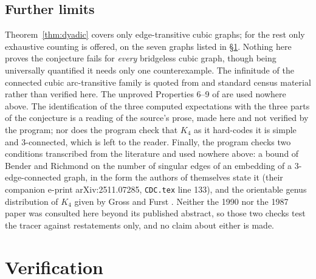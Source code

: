 \documentclass[11pt]{amsart}
\begin{document}
\subsection*{Further limits}
Theorem~\ref{thm:dyadic} covers only edge-transitive cubic graphs; for the
rest only exhaustive counting is offered, on the seven graphs listed in
\S\ref{sec:verification}. Nothing here proves the conjecture fails for
\emph{every} bridgeless cubic graph, though being universally quantified it
needs only one counterexample. The infinitude of the connected cubic
arc-transitive family is quoted from \cite{BH} and standard census material
rather than verified here. The unproved Properties 6--9 of \cite{GS} are used
nowhere above. The identification of the three computed expectations with the
three parts of the conjecture is a reading of the source's prose, made here and
not verified by the program; nor does the program check that $K_4$ as it
hard-codes it is simple and $3$-connected, which is left to the reader.
Finally, the program checks two conditions transcribed from the literature and
used nowhere above: a bound of Bender and Richmond \cite{BR} on the number of
singular edges of an embedding of a $3$-edge-connected graph, in the form the
authors of \cite{GS} themselves state it (their companion e-print
arXiv:2511.07285, \texttt{CDC.tex} line 133), and the orientable genus
distribution of $K_4$ given by Gross and Furst \cite{GF}. Neither the 1990 nor
the 1987 paper was consulted here beyond its published abstract, so those two
checks test the tracer against restatements only, and no claim about either is
made.

\section{Verification}\label{sec:verification}
\end{document}
